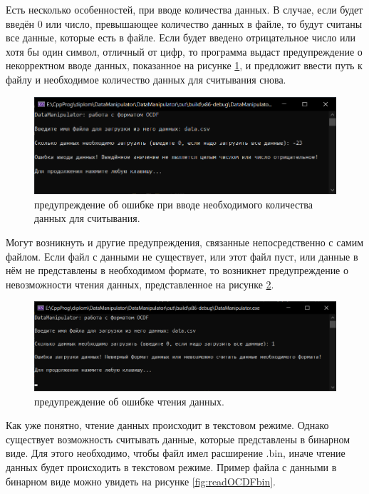 {  \par Есть несколько особенностей, при вводе количества данных. В случае, если будет введён 0 или число, превышающее количество данных в файле, то будут считаны все данные, которые есть в файле. Если будет введено отрицательное число или хотя бы один символ, отличный от цифр, то программа выдаст предупреждение о некорректном вводе данных, показанное на рисунке \ref{fig:readOCDFerror1}, и предложит ввести путь к файлу и необходимое количество данных для считывания снова. 

  \begin{figure}[H]
    \centering
    \includegraphics[width=\textwidth]{images/forDataManipulator/readOCDFerror1.png}
    \caption{предупреждение об ошибке при вводе необходимого количества данных для считывания.}
    \label{fig:readOCDFerror1}
  \end{figure}

  \par Могут возникнуть и другие предупреждения, связанные непосредственно с самим файлом. Если файл с данными не существует, или этот файл пуст, или данные в нём не представлены в необходимом формате, то возникнет предупреждение о невозможности чтения данных, представленное на рисунке \ref{fig:readOCDFerror2}.

  \begin{figure}[H]
    \centering
    \includegraphics[width=\textwidth]{images/forDataManipulator/readOCDFerror2.png}
    \caption{предупреждение об ошибке чтения данных.} 
    \label{fig:readOCDFerror2}
  \end{figure}

  \par Как уже понятно, чтение данных происходит в текстовом режиме. Однако существует возможность считывать данные, которые представлены в бинарном виде. Для этого необходимо, чтобы файл имел расширение .bin, иначе чтение данных будет происходить в текстовом режиме. Пример файла с данными в бинарном виде можно увидеть на рисунке \ref{fig:readOCDFbin}.

}

